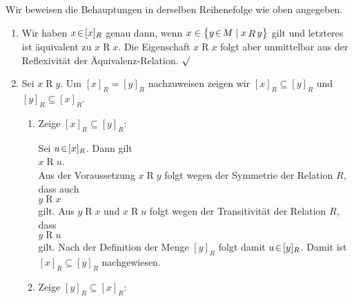 \proof
Wir beweisen die Behauptungen in derselben Reihenefolge wie oben angegeben.
\begin{enumerate}
\item Wir haben $x \!\in\! [x]_R$ genau dann, wenn 
      $x \in \bigl\{ y \!\in\! M \mid x \mathop{R} y \bigr\}$ gilt und letzteres ist
      \"{a}quivalent zu $x \mathop{R} x$.
      Die Eigenschaft $x \mathop{R} x$ folgt aber unmittelbar aus der Reflexivit\"{a}t der \"{A}quivalenz-Relation. $\surd$
\item Sei  $x \mathop{R} y$.  Um $[x]_R = [y]_R$ nachzuweisen zeigen wir
      $[x]_R \subseteq [y]_R$ und $[y]_R \subseteq [x]_R$.

      \begin{enumerate}
      \item Zeige $[x]_R \subseteq [y]_R$:
        
            Sei $u \!\in\! [x]_R$.  Dann gilt
            \\[0.2cm]
            \hspace*{1.3cm}
            $x \mathop{R} u$.  
            \\[0.2cm]
            Aus der Voraussetzung
            $x \mathop{R} y$ folgt wegen der Symmetrie der Relation $R$, dass auch
            \\[0.2cm]
            \hspace*{1.3cm}
            $y \mathop{R} x$ 
            \\[0.2cm]
            gilt.  Aus 
            $y \mathop{R} x$ und $x \mathop{R} u$ folgt wegen der Transitivit\"{a}t der Relation
            $R$, dass
            \\[0.2cm]
            \hspace*{1.3cm}
            $y \mathop{R} u$ 
            \\[0.2cm]
            gilt.  Nach der Definition der
            Menge $[y]_R$ folgt damit $u \!\in\! [y]_R$. 
            Damit ist $[x]_R \subseteq [y]_R$ nachgewiesen.
      \item Zeige $[y]_R \subseteq [x]_R$:


\end{enumerate}
\end{enumerate}
